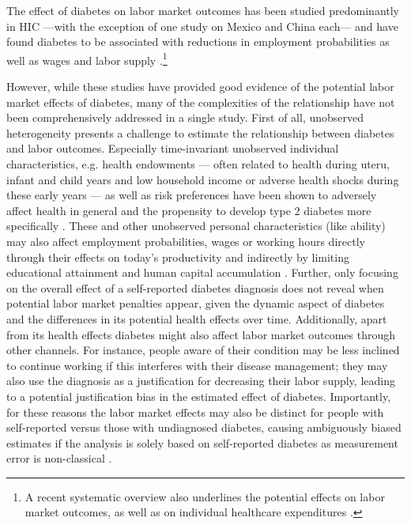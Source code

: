 \documentclass[12pt,english]{article}
\begin{document}
The effect of diabetes on labor market outcomes has been studied predominantly in \ac{HIC} ---with the exception of one study on Mexico \parencite{Seuring2015} and China  each--- and have found diabetes to be associated with reductions in employment probabilities as well as wages and labor supply \parencite{Brown2005,Brown2014,BrownIII2011,Minor2010,Minor2013,Minor2015,Latif2009}.\footnote{A recent systematic overview also underlines the potential effects on labor market outcomes, as well as on individual healthcare expenditures \parencite{Seuring2015a}.}

However, while these studies have provided good evidence of the potential labor market effects of diabetes, many of the complexities of the relationship have not been comprehensively addressed in a single study. First of all, unobserved heterogeneity presents a challenge to estimate the relationship between diabetes and labor outcomes. Especially time-invariant unobserved individual characteristics, e.g. health endowments --- often related to health during uteru, infant and child years and low household income or adverse health shocks during these early years --- as well as risk preferences have been shown to adversely affect health in general and the propensity to develop type 2 diabetes more specifically \parencite{VanEwijk2011,Sotomayor2013,Li2010b}. These and other unobserved personal characteristics (like ability) may also affect employment probabilities, wages or working hours directly through their effects on today's productivity \parencite{Currie2013} and indirectly by limiting educational attainment and human capital accumulation \parencite{Ayyagari2011a}. Further, only focusing on the overall effect of a self-reported diabetes diagnosis does not reveal when potential labor market penalties appear, given the dynamic aspect of diabetes and the differences in its potential health effects over time. Additionally, apart from its health effects diabetes might also affect labor market outcomes through other channels. For instance, people aware of their condition may be less inclined to continue working if this interferes with their disease management; they may also use the diagnosis as a justification for decreasing their labor supply, leading to a potential justification bias \parencite{Kapteyn2009} in the estimated effect of diabetes. Importantly, for these reasons the labor market effects may also be distinct for people with self-reported versus those with undiagnosed diabetes, causing ambiguously biased estimates if the analysis is solely based on self-reported diabetes as measurement error is non-classical \parencite{Cawley2015}.
\end{document}
